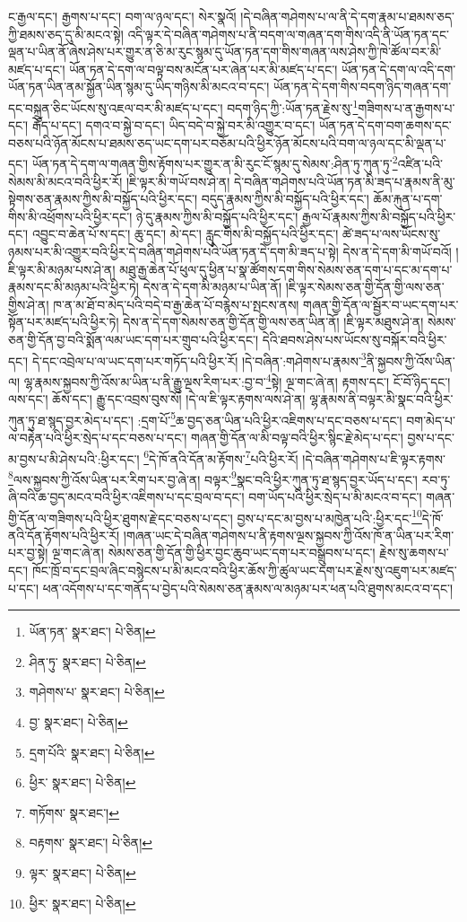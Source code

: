 ང་རྒྱལ་དང་། རྒྱགས་པ་དང་། བག་ལ་ཉལ་དང་། སེར་སྣའོ། །དེ་བཞིན་གཤེགས་པ་ལ་ནི་དེ་དག་རྣམ་པ་ཐམས་ཅད་ཀྱི་ཐམས་ཅད་དུ་མི་མངའ་སྟེ། འདི་ལྟར་དེ་བཞིན་གཤེགས་པ་ནི་བདག་ལ་གཞན་དག་གིས་འདི་ནི་ཡོན་ཏན་དང་ལྡན་པ་ཡིན་ནོ་ཞེས་ཤེས་པར་གྱུར་ན་ཅི་མ་རུང་སྙམ་དུ་ཡོན་ཏན་དག་གིས་གཞན་ལས་ཤེས་ཀྱི་ཁེ་ཚོལ་བར་མི་མཛད་པ་དང་། ཡོན་ཏན་དེ་དག་ལ་བལྟ་བས་མངོན་པར་ཞེན་པར་མི་མཛད་པ་དང་། ཡོན་ཏན་དེ་དག་ལ་འདི་དག་ཡོན་ཏན་ཡིན་ནམ་སྐྱོན་ཡིན་སྙམ་དུ་ཡིད་གཉིས་མི་མངའ་བ་དང་། ཡོན་ཏན་དེ་དག་གིས་བདག་ཉིད་གཞན་དག་དང་བསྐྲུན་ཅིང་ཡོངས་སུ་འཇལ་བར་མི་མཛད་པ་དང་། བདག་ཉིད་ཀྱི་:ཡོན་ཏན་རྗེས་སུ་\footnote{ཡོན་ཏན་  སྣར་ཐང་།  པེ་ཅིན། }གཟིགས་པ་ན་རྒྱགས་པ་དང་། རྒོད་པ་དང་། དགའ་བ་སྐྱེ་བ་དང་། ཡིད་བདེ་བ་སྐྱེ་བར་མི་འགྱུར་བ་དང་། ཡོན་ཏན་དེ་དག་བག་ཆགས་དང་བཅས་པའི་ཉོན་མོངས་པ་ཐམས་ཅད་ཡང་དག་པར་བཅོམ་པའི་ཕྱིར་ཉོན་མོངས་པའི་བག་ལ་ཉལ་དང་མི་ལྡན་པ་དང་། ཡོན་ཏན་དེ་དག་ལ་གཞན་གྱིས་རྟོགས་པར་གྱུར་ན་མི་རུང་ངོ་སྙམ་དུ་སེམས་:ཤིན་ཏུ་ཀུན་ཏུ་\footnote{ཤིན་ཏུ་  སྣར་ཐང་།  པེ་ཅིན། }འཛིན་པའི་སེམས་མི་མངའ་བའི་ཕྱིར་རོ། །ཇི་ལྟར་མི་གཡོ་བས་ཤེ་ན། དེ་བཞིན་གཤེགས་པའི་ཡོན་ཏན་མི་ཟད་པ་རྣམས་ནི་མུ་སྟེགས་ཅན་རྣམས་ཀྱིས་མི་བསྐྱོད་པའི་ཕྱིར་དང་། བདུད་རྣམས་ཀྱིས་མི་བསྐྱོད་པའི་ཕྱིར་དང་། ཆོམ་རྐུན་པ་དག་གིས་མི་འཕྲོགས་པའི་ཕྱིར་དང་། ཉེ་དུ་རྣམས་ཀྱིས་མི་བསྐྱོད་པའི་ཕྱིར་དང་། རྒྱལ་པོ་རྣམས་ཀྱིས་མི་བསྐྱོད་པའི་ཕྱིར་དང་། འབྱུང་བ་ཆེན་པོ་ས་དང་། ཆུ་དང་། མེ་དང་། རླུང་གིས་མི་བསྐྱོད་པའི་ཕྱིར་དང་། ཚེ་ཟད་པ་ལས་ཡོངས་སུ་ཉམས་པར་མི་འགྱུར་བའི་ཕྱིར་དེ་བཞིན་གཤེགས་པའི་ཡོན་ཏན་དེ་དག་མི་ཟད་པ་སྟེ། དེས་ན་དེ་དག་མི་གཡོ་བའོ། །ཇི་ལྟར་མི་མཉམ་པས་ཤེ་ན། མཐུ་རྒྱ་ཆེན་པོ་ཕུལ་དུ་ཕྱིན་པ་སྣ་ཚོགས་དག་གིས་སེམས་ཅན་དག་པ་དང་མ་དག་པ་རྣམས་དང་མི་མཉམ་པའི་ཕྱིར་ཏེ། དེས་ན་དེ་དག་མི་མཉམ་པ་ཡིན་ནོ། །ཇི་ལྟར་སེམས་ཅན་གྱི་དོན་གྱི་ལས་ཅན་གྱིས་ཤེ་ན། ཁ་ན་མ་ཐོ་བ་མེད་པའི་བདེ་བ་རྒྱ་ཆེན་པོ་བརྙེས་པ་སྤངས་ནས། གཞན་གྱི་དོན་ལ་སྦྱོར་བ་ཡང་དག་པར་སྟོན་པར་མཛད་པའི་ཕྱིར་ཏེ། དེས་ན་དེ་དག་སེམས་ཅན་གྱི་དོན་གྱི་ལས་ཅན་ཡིན་ནོ། །ཇི་ལྟར་མཐུས་ཤེ་ན། སེམས་ཅན་གྱི་དོན་བྱ་བའི་སྨོན་ལམ་ཡང་དག་པར་གྲུབ་པའི་ཕྱིར་དང་། དེའི་ཐབས་ཤེས་པས་ཡོངས་སུ་བསྐོར་བའི་ཕྱིར་དང་། དེ་དང་འབྲེལ་པ་ལ་ཡང་དག་པར་གཏོད་པའི་ཕྱིར་རོ། །དེ་བཞིན་:གཤེགས་པ་རྣམས་\footnote{གཤེགས་པ་  སྣར་ཐང་།  པེ་ཅིན། }ནི་སྐྱབས་ཀྱི་འོས་ཡིན་ལ། ལྷ་རྣམས་སྐྱབས་ཀྱི་འོས་མ་ཡིན་པ་ནི་རྒྱུ་ལྔས་རིག་པར་:བྱ་བ་\footnote{བྱ་  སྣར་ཐང་།  པེ་ཅིན། }སྟེ། ལྔ་གང་ཞེ་ན། རྟགས་དང་། ངོ་བོ་ཉིད་དང་། ལས་དང་། ཆོས་དང་། རྒྱུ་དང་འབྲས་བུས་སོ། །དེ་ལ་ཇི་ལྟར་རྟགས་ལས་ཤེ་ན། ལྷ་རྣམས་ནི་བལྟར་མི་སྣང་བའི་ཕྱིར་ཀུན་ཏུ་ཐ་སྙད་བྱར་མེད་པ་དང་། :དྲག་པོ་\footnote{དྲག་པོའི་  སྣར་ཐང་།  པེ་ཅིན། }ཆ་བྱད་ཅན་ཡིན་པའི་ཕྱིར་འཇིགས་པ་དང་བཅས་པ་དང་། བག་མེད་པ་ལ་བརྟེན་པའི་ཕྱིར་སྲེད་པ་དང་བཅས་པ་དང་། གཞན་གྱི་དོན་ལ་མི་བལྟ་བའི་ཕྱིར་སྙིང་རྗེ་མེད་པ་དང་། བྱས་པ་དང་མ་བྱས་པ་མི་ཤེས་པའི་:ཕྱིར་དང་། \footnote{ཕྱིར་  སྣར་ཐང་།  པེ་ཅིན། }དེ་ཁོ་ནའི་དོན་མ་རྟོགས་\footnote{གཏོགས་  སྣར་ཐང་། }པའི་ཕྱིར་རོ། །དེ་བཞིན་གཤེགས་པ་ཇི་ལྟར་རྟགས་\footnote{བརྟགས་  སྣར་ཐང་།  པེ་ཅིན། }ལས་སྐྱབས་ཀྱི་འོས་ཡིན་པར་རིག་པར་བྱ་ཞེ་ན། བལྟར་\footnote{ལྟར་  སྣར་ཐང་།  པེ་ཅིན། }སྣང་བའི་ཕྱིར་ཀུན་ཏུ་ཐ་སྙད་བྱར་ཡོད་པ་དང་། རབ་ཏུ་ཞི་བའི་ཆ་བྱད་མངའ་བའི་ཕྱིར་འཇིགས་པ་དང་བྲལ་བ་དང་། བག་ཡོད་པའི་ཕྱིར་སྲེད་པ་མི་མངའ་བ་དང་། གཞན་གྱི་དོན་ལ་གཟིགས་པའི་ཕྱིར་ཐུགས་རྗེ་དང་བཅས་པ་དང་། བྱས་པ་དང་མ་བྱས་པ་མཁྱེན་པའི་:ཕྱིར་དང་\footnote{ཕྱིར་  སྣར་ཐང་།  པེ་ཅིན། }དེ་ཁོ་ནའི་དོན་རྟོགས་པའི་ཕྱིར་རོ། །གཞན་ཡང་དེ་བཞིན་གཤེགས་པ་ནི་རྟགས་ལྔས་སྐྱབས་ཀྱི་འོས་ཁོ་ན་ཡིན་པར་རིག་པར་བྱ་སྟེ། ལྔ་གང་ཞེ་ན། སེམས་ཅན་གྱི་དོན་གྱི་ཕྱིར་བྱང་ཆུབ་ཡང་དག་པར་བསྒྲུབས་པ་དང་། རྗེས་སུ་ཆགས་པ་དང་། ཁོང་ཁྲོ་བ་དང་བྲལ་ཞིང་བསྙེངས་པ་མི་མངའ་བའི་ཕྱིར་ཆོས་ཀྱི་ཚུལ་ཡང་དག་པར་རྗེས་སུ་འཇུག་པར་མཛད་པ་དང་། ཕན་འདོགས་པ་དང་གནོད་པ་བྱེད་པའི་སེམས་ཅན་རྣམས་ལ་མཉམ་པར་ཕན་པའི་ཐུགས་མངའ་བ་དང་། 
